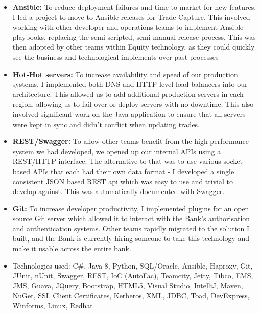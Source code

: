 \documentclass[11pt,a4paper, roman]{moderncv} %
\begin{document}
{\begin{itemize}
\item \textbf{Ansible:} To reduce deployment failures and time to market for new features, I led a project to move to Ansible releases for Trade Capture. This involved working with other developer and operations teams to implement Ansible playbooks, replacing the semi-scripted, semi-manual release process. This was then adopted by other teams within Equity technology, as they could quickly see the business and technological implements over past processes
\item \textbf{Hot-Hot servers:} To increase availability and speed of our production systems, I implemented both DNS and HTTP level load balancers into our architecture. This allowed us to add additional production servers in each region, allowing us to fail over or deploy servers with no downtime. This also involved significant work on the Java application to ensure that all servers were kept in sync and didn't conflict when updating trades.
\item \textbf{REST/Swagger:} To allow other teams benefit from the high performance system we had developed, we opened up our internal APIs using a REST/HTTP interface. The alternative to that was to use various socket based APIs that each had their own data format - I developed a single consistent JSON based REST api which was easy to use and trivial to develop against. This was automatically documented with Swagger.
\item \textbf{Git:} To increase developer productivity, I implemented plugins for an open source Git server which allowed it to interact with the Bank's authorisation and authentication systems. Other teams rapidly migrated to the solution I built, and the Bank is currently hiring someone to take this technology and make it usable across the entire bank.
\item {Technologies used:} C\#, Java 8, Python, SQL/Oracle, Ansible, Haproxy, Git, JUnit, nUnit, Swagger, REST, IoC (AutoFac), Teamcity, Jetty, Tibco, EMS, JMS, Guava, JQuery, Bootstrap, HTML5, Visual Studio, IntelliJ, Maven, NuGet, SSL Client Certificates, Kerberos, XML, JDBC, Toad, DevExpress, Winforms, Linux, Redhat
\end{itemize}
}
\nopagebreak
\end{document}
